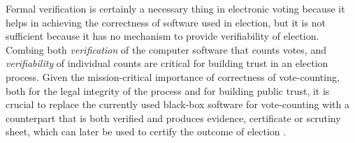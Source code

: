    \noindent
   Formal verification is certainly a necessary thing in electronic voting because 
   it helps in achieving the correctness of software used in election, but it is not sufficient because
   it has no mechanism to provide  verifiability of election. 
   Combing both \emph{verification} of the
	computer software that counts votes, and
	\emph{verifiability} of individual counts are critical for
	building trust in an election process.  Given the mission-critical importance of
	 correctness of vote-counting,
	both for the legal integrity of the process and for
	building public trust,  it is crucial to replace the
	currently used black-box software for vote-counting with a
	counterpart that is both verified and produces 
	evidence, certificate or scrutiny sheet, which can later be used to certify
	the outcome of election \citep{Bernhard:2017:PES} \citep{Rivest:2008:PTRS}.
	
	
	
	
%
   
